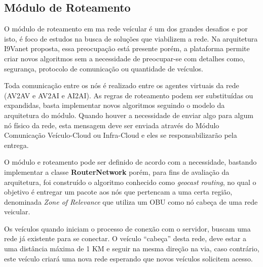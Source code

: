 \documentclass[
	12pt,				%
	oneside,			%
	a4paper,			%
	english,			%
	brazil				%
	]{abntex2ppgsi}
\begin{document}
\subsection{Módulo de Roteamento}

O módulo de roteamento em ma rede veícular é um dos grandes desafios e por isto, é foco de estudos na busca de soluções que viabilizem a rede. Na arquitetura I9Vanet proposta, essa preocupação está presente porém, a plataforma permite criar novos algoritmos sem a necessidade de preocupar-se com detalhes como, segurança, protocolo de comunicação ou quantidade de veículos.

Toda comunicação entre os nós é realizado entre os agentes virtuais da rede (AV2AV e AV2AI e AI2AI). As regras de roteamento podem ser substituídas ou expandidas, basta implementar novos algoritmos seguindo o modelo da arquitetura do módulo. Quando houver a necessidade de enviar algo para algum nó físico da rede, esta mensagem deve ser enviada através do Módulo Comunicação Veículo-Cloud ou Infra-Cloud e eles se responsabilizarão pela entrega.


O módulo e roteamento pode ser definido de acordo com a necessidade, bastando implementar a classe \textbf{RouterNetwork} porém, para fins de avaliação da arquitetura, foi construído o algoritmo conhecido como \textit{geocast routing}, no qual o objetivo é entregar um pacote aos nós que pertencam a uma certa região, denominada \textit{Zone of Relevance} que utiliza um OBU como nó cabeça de uma rede veicular.

Os veículos quando iniciam o processo de conexão com o servidor, buscam uma rede  já existente para se conectar. O veículo ``cabeça'' desta rede, deve estar a uma distância máxima de 1 KM e seguir na mesma direção na via, caso contrário, este veículo criará uma nova rede esperando que novos veículos solicitem acesso.
\end{document}

